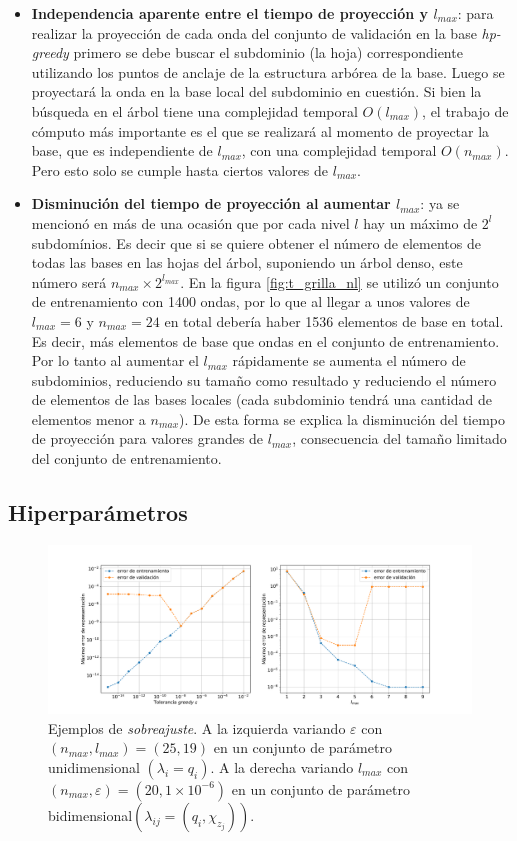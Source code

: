 \begin{itemize}
\item \textbf{Independencia aparente entre el tiempo de proyección y $l_{max}$}: para realizar la proyección de cada onda del conjunto de validación en la base \textit{hp-greedy} primero se debe buscar el subdominio (la hoja) correspondiente utilizando los puntos de anclaje de la estructura arbórea de la base. Luego se proyectará la onda en la base local del subdominio en cuestión. Si bien la búsqueda en el árbol tiene una complejidad temporal $O(l_{max})$, el trabajo de cómputo más importante es el que se realizará al momento de proyectar la base, que es independiente de $l_{max}$, con una complejidad temporal $O(n_{max})$. Pero esto solo se cumple hasta ciertos valores de $l_{max}$.
\item \textbf{Disminución del tiempo de proyección al aumentar $l_{max}$}: ya se mencionó en más de una ocasión que por cada nivel $l$ hay un máximo de $2^l$ subdomínios. Es decir que si se quiere obtener el número de elementos de todas las bases en las hojas del árbol, suponiendo un árbol denso, este número será $n_{max} \times 2^{l_{max}}$. En la figura \ref{fig:t_grilla_nl} se utilizó un conjunto de entrenamiento con 1400 ondas, por lo que al llegar a unos valores de $l_{max} = 6$ y $n_{max} = 24$ en total debería haber 1536 elementos de base en total. Es decir, más elementos de base que ondas en el conjunto de entrenamiento. Por lo tanto al aumentar el $l_{max}$ rápidamente se aumenta el número de subdominios, reduciendo su tamaño como resultado y reduciendo el número de elementos de las bases locales (cada subdominio tendrá una cantidad de elementos menor a $n_{max}$). De esta forma se explica la disminución del tiempo de proyección para valores grandes de $l_{max}$, consecuencia del tamaño limitado del conjunto de entrenamiento.
\end{itemize}


\subsection{Hiperparámetros}

\begin{figure}[h!]
\centering
\includegraphics[width=1\columnwidth ,trim={2cm, 1cm, 1cm, 1.2cm}]{figs/overfit.pdf}
\caption{Ejemplos de \textit{sobreajuste}. A la izquierda variando $\varepsilon$ con $(n_{max}, l_{max}) = (25, 19)$ en un conjunto de parámetro unidimensional $(\lambda_i = q_i)$. A la derecha variando $l_{max}$ con $(n_{max}, \varepsilon) = (20, 1\times10^{-6})$ en un conjunto de parámetro bidimensional$(\lambda_{ij} = (q_i, \chi_{z_j})) $.}
\label{fig:overfit}
\end{figure}

